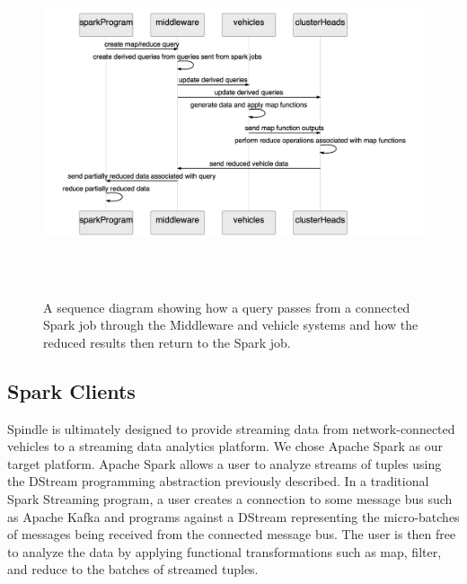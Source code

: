 \documentclass{thesis}
\begin{document}
    \begin{figure}
        \centering
        \includegraphics[height=4in, width=6in]{binImages/theoretical-sequence.png}
        \caption{A sequence diagram showing how a query passes from a connected Spark job
        through the Middleware and vehicle systems and how the reduced results then return
        to the Spark job.}
        \label{fig:theoretical:sequence}
    \end{figure}

\subsection{Spark Clients}
    Spindle is ultimately designed to provide streaming data from network-connected vehicles to a streaming data
    analytics platform. We chose Apache Spark as our target platform. Apache Spark allows a user to analyze
    streams of tuples using the DStream programming abstraction previously described. In a traditional Spark
    Streaming program, a user creates a connection to some message bus such as Apache Kafka and programs against
    a DStream representing the micro-batches of messages being received from the connected message bus. The user
    is then free to analyze the data by applying functional transformations such as map, filter, and reduce
    to the batches of streamed tuples. 
    
\end{document}
